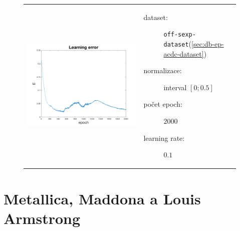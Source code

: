 \documentclass[thesis=M,czech]{FITthesis}[2012/06/26]
\begin{document}
\begin{figure}[htbp]
\begin{tabular}{p{}p{}}
    \begin{minipage}{.5\textwidth}
    \centering
    \includegraphics[scale=0.3]{err_db-ep-acdc.png}
    \label{fig:fig1}
    \end{minipage}
    &
    \begin{minipage}{.5\textwidth}
		\begin{description}
            \item[dataset:] \texttt{off-sexp-dataset}(\ref{sec:db-ep-acdc-dataset})
            \item[normalizace:] interval $[0;0.5]$
            \item[počet epoch:] $2000$
            \item[learning rate:] $0.1$
        \end{description}
\end{minipage}
\end{tabular}
\end{figure}



\section{Metallica, Maddona a Louis Armstrong}\label{exp:met-mad-la}
\end{document}
